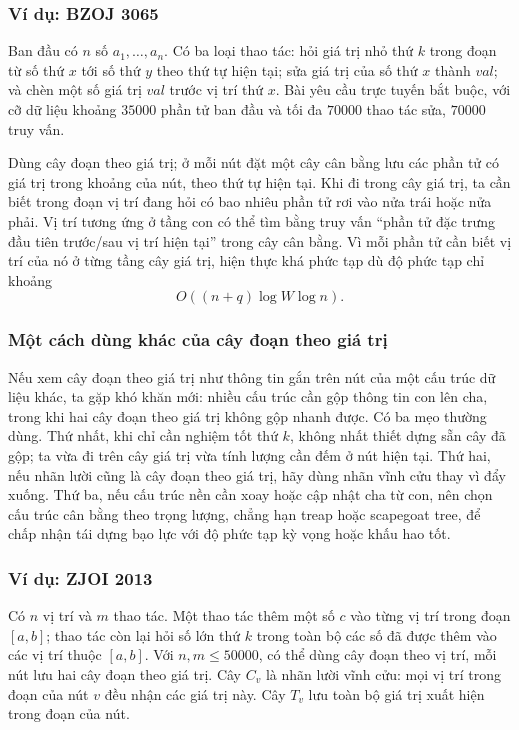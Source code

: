 \documentclass[11pt]{article}
\begin{document}
\subsubsection{Ví dụ: BZOJ 3065}

Ban đầu có \(n\) số \(a_1,\ldots,a_n\). Có ba loại thao tác: hỏi giá trị nhỏ
thứ \(k\) trong đoạn từ số thứ \(x\) tới số thứ \(y\) theo thứ tự hiện tại; sửa
giá trị của số thứ \(x\) thành \(\mathit{val}\); và chèn một số giá trị
\(\mathit{val}\) trước vị trí thứ \(x\). Bài yêu cầu trực tuyến bắt buộc, với
cỡ dữ liệu khoảng \(35000\) phần tử ban đầu và tối đa \(70000\) thao tác sửa,
\(70000\) truy vấn.

Dùng cây đoạn theo giá trị; ở mỗi nút đặt một cây cân bằng lưu các phần tử có
giá trị trong khoảng của nút, theo thứ tự hiện tại. Khi đi trong cây giá trị,
ta cần biết trong đoạn vị trí đang hỏi có bao nhiêu phần tử rơi vào nửa trái
hoặc nửa phải. Vị trí tương ứng ở tầng con có thể tìm bằng truy vấn ``phần tử
đặc trưng đầu tiên trước/sau vị trí hiện tại'' trong cây cân bằng. Vì mỗi phần
tử cần biết vị trí của nó ở từng tầng cây giá trị, hiện thực khá phức tạp dù
độ phức tạp chỉ khoảng
\[
  O((n+q)\log W\log n).
\]

\subsubsection{Một cách dùng khác của cây đoạn theo giá trị}

Nếu xem cây đoạn theo giá trị như thông tin gắn trên nút của một cấu trúc dữ
liệu khác, ta gặp khó khăn mới: nhiều cấu trúc cần gộp thông tin con lên cha,
trong khi hai cây đoạn theo giá trị không gộp nhanh được. Có ba mẹo thường dùng.
Thứ nhất, khi chỉ cần nghiệm tốt thứ \(k\), không nhất thiết dựng sẵn cây đã gộp;
ta vừa đi trên cây giá trị vừa tính lượng cần đếm ở nút hiện tại. Thứ hai, nếu
nhãn lười cũng là cây đoạn theo giá trị, hãy dùng nhãn vĩnh cửu thay vì đẩy
xuống. Thứ ba, nếu cấu trúc nền cần xoay hoặc cập nhật cha từ con, nên chọn
cấu trúc cân bằng theo trọng lượng, chẳng hạn treap hoặc scapegoat tree, để
chấp nhận tái dựng bạo lực với độ phức tạp kỳ vọng hoặc khấu hao tốt.

\subsubsection{Ví dụ: ZJOI 2013}

Có \(n\) vị trí và \(m\) thao tác. Một thao tác thêm một số \(c\) vào từng vị
trí trong đoạn \([a,b]\); thao tác còn lại hỏi số lớn thứ \(k\) trong toàn bộ
các số đã được thêm vào các vị trí thuộc \([a,b]\). Với \(n,m\le 50000\), có
thể dùng cây đoạn theo vị trí, mỗi nút lưu hai cây đoạn theo giá trị. Cây
\(C_v\) là nhãn lười vĩnh cửu: mọi vị trí trong đoạn của nút \(v\) đều nhận
các giá trị này. Cây \(T_v\) lưu toàn bộ giá trị xuất hiện trong đoạn của nút.
\end{document}

